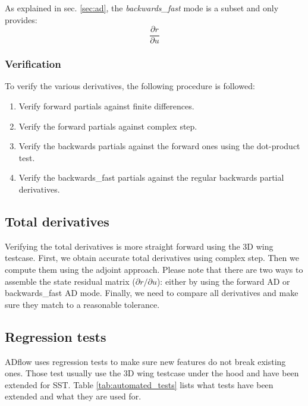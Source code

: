 As explained in sec. \ref{sec:ad}, the \textit{backwards\_fast} mode is a
subset and only provides:
\begin{equation}
    \frac{\partial r}{\partial u}
\end{equation}


\subsubsection{Verification}
To verify the various derivatives, the following procedure is followed:

\begin{enumerate}
    \item Verify forward partials against finite differences.

    \item Verify the forward partials against complex step.

    \item Verify the backwards partials against the forward ones using the
        dot-product test.

    \item Verify the backwards\_fast partials against the regular backwards
        partial derivatives.
\end{enumerate}




\subsection{Total derivatives}
\label{subsec:total_derivs}
Verifying the total derivatives is more straight forward using the 3D wing
testcase. First, we obtain accurate total derivatives using complex step. Then
we compute them using the adjoint approach. Please note that there are two ways
to assemble the state residual matrix ($\partial r / \partial u$): either by
using the forward AD or backwards\_fast AD mode. Finally, we need to compare
all derivatives and make sure they match to a reasonable tolerance.




\subsection{Regression tests}
\noindent ADflow uses regression tests to make sure new features do not break
existing ones. Those test usually use the 3D wing testcase under the hood and
have been extended for SST. Table \ref{tab:automated_tests} lists what tests
have been extended and what they are used for.

